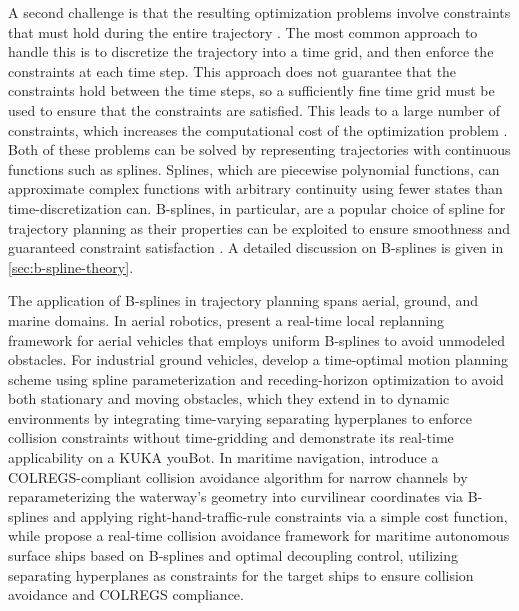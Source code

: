 A second challenge is that the resulting optimization problems involve constraints that must hold during the entire trajectory \citep{mercy2016spline}. The most common approach to handle this is to discretize the trajectory into a time grid, and then enforce the constraints at each time step. This approach does not guarantee that the constraints hold between the time steps, so a sufficiently fine time grid must be used to ensure that the constraints are satisfied. This leads to a large number of constraints, which increases the computational cost of the optimization problem \citep{mercy2016spline}.
Both of these problems can be solved by representing trajectories with continuous functions such as splines. Splines, which are piecewise polynomial functions, can approximate complex functions with arbitrary continuity using fewer states than time-discretization can. B-splines, in particular, are a popular choice of spline for trajectory planning as their properties can be exploited to ensure smoothness and guaranteed constraint satisfaction \citep{van2015b}. A detailed discussion on B-splines is given in \cref{sec:b-spline-theory}.



The application of B-splines in trajectory planning spans aerial, ground, and marine domains. In aerial robotics, \citet{usenko2017real} present a real-time local replanning framework for aerial vehicles that employs uniform B-splines to avoid unmodeled obstacles. For industrial ground vehicles, \citet{mercy2016spline} develop a time-optimal motion planning scheme using spline parameterization and receding-horizon optimization to avoid both stationary and moving obstacles, which they extend in \citet{mercy2017spline} to dynamic environments by integrating time-varying separating hyperplanes to enforce collision constraints without time-gridding and demonstrate its real-time applicability on a KUKA youBot. In maritime navigation, \citet{cho2021colreg} introduce a COLREGS-compliant collision avoidance algorithm for narrow channels by reparameterizing the waterway’s geometry into curvilinear coordinates via B-splines and applying right-hand-traffic-rule constraints via a simple cost function,  while \citet{zhang2021real} propose a real-time collision avoidance framework for maritime autonomous surface ships based on B-splines and optimal decoupling control, utilizing separating hyperplanes as constraints for the target ships to ensure collision avoidance and COLREGS compliance. 


